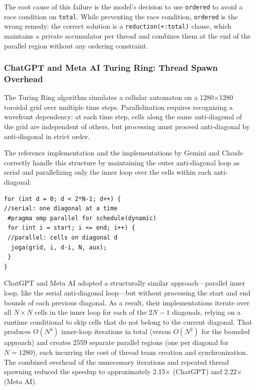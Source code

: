 \documentclass[conference]{IEEEtran}
\begin{document}
The root cause of this failure is the model's decision to use \texttt{ordered} to avoid a race condition on \texttt{total}. While preventing the race condition, \texttt{ordered} is the wrong remedy: the correct solution is a \texttt{reduction(+:total)} clause, which maintains a private accumulator per thread and combines them at the end of the parallel region without any ordering constraint.

\subsubsection{ChatGPT and Meta AI Turing Ring: Thread Spawn Overhead} \label{subsec:chatgpt_metaai_tr}

The Turing Ring algorithm simulates a cellular automaton on a 1280$\times$1280 toroidal grid over multiple time steps. 
Parallelization requires recognizing a wavefront dependency: at each time step, cells along the same anti-diagonal of the grid are independent of others, but processing must proceed anti-diagonal by anti-diagonal in strict order.

The reference implementation and the implementations by Gemini and Claude correctly handle this structure by maintaining the outer anti-diagonal loop as serial and parallelizing only the inner loop over the cells within each anti-diagonal:

\begin{verbatim}
for (int d = 0; d < 2*N-1; d++) { 
//serial: one diagonal at a time
 #pragma omp parallel for schedule(dynamic)
 for (int i = start; i <= end; i++) { 
 //parallel: cells on diagonal d
  joga(grid, i, d-i, N, aux);
 }
}
\end{verbatim}

ChatGPT and Meta AI adopted a structurally similar approach—parallel inner loop, like the serial anti-diagonal loop—but without processing the start and end bounds of each previous diagonal. 
As a result, their implementations iterate over all $N \times N$ cells in the inner loop for each of the $2N-1$ diagonals, relying on a runtime conditional to skip cells that do not belong to the current diagonal. 
That produces $O(N^3)$ inner-loop iterations in total (versus $O(N^2)$ for the bounded approach) and creates 2559 separate parallel regions (one per diagonal for $N=1280$), each incurring the cost of thread team creation and synchronization. 
The combined overhead of the unnecessary iterations and repeated thread spawning reduced the speedup to approximately 2.15$\times$ (ChatGPT) and 2.22$\times$ (Meta AI).
\end{document}
